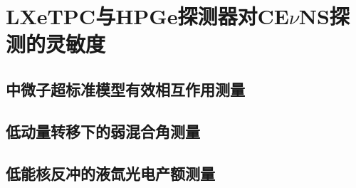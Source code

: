 
\chapter{LXeTPC与HPGe探测器对CE$\nu$NS探测的灵敏度}

\section{中微子超标准模型有效相互作用测量}

\section{低动量转移下的弱混合角测量}

\section{低能核反冲的液氙光电产额测量}
